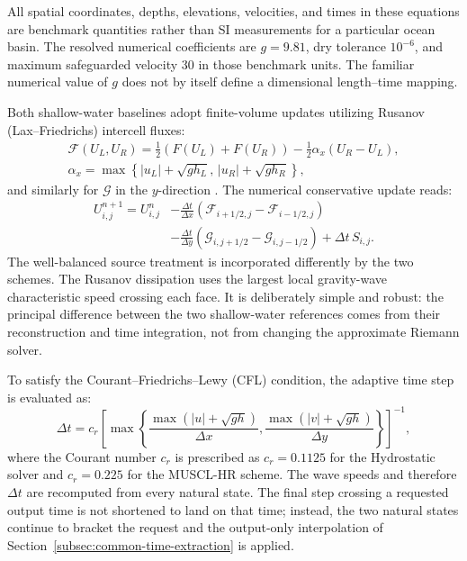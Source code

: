 All spatial coordinates, depths, elevations, velocities, and times in these equations are benchmark quantities rather than SI measurements for a particular ocean basin. The resolved numerical coefficients are $g = 9.81$, dry tolerance $10^{-6}$, and maximum safeguarded velocity $30$ in those benchmark units. The familiar numerical value of $g$ does not by itself define a dimensional length--time mapping.

Both shallow-water baselines adopt finite-volume updates utilizing Rusanov (Lax–Friedrichs) intercell fluxes:
\begin{equation}
\begin{split}
\mathcal{F}(U_L, U_R) = \frac{1}{2}\left(F(U_L) + F(U_R)\right) - \frac{1}{2} \alpha_x(U_R - U_L),
\\
\alpha_x = \max\!\left\{|u_L| + \sqrt{gh_L},\, |u_R| + \sqrt{gh_R}\right\},
\end{split}
\end{equation}
and similarly for $\mathcal{G}$ in the $y$-direction \citep{toro2009riemann,toro2026rusanov}. The numerical conservative update reads:
\begin{equation}
\begin{split}
U_{i,j}^{n + 1} = U_{i, j}^{n}
&- \frac{\Delta t}{\Delta x}
\left(\mathcal{F}_{i + 1/2, j} - \mathcal{F}_{i - 1/2, j}\right) \\
&- \frac{\Delta t}{\Delta y}
\left(\mathcal{G}_{i, j + 1/2} - \mathcal{G}_{i, j - 1/2}\right)
+ \Delta t\,S_{i, j}.
\end{split}
\end{equation}
The well-balanced source treatment is incorporated differently by the two schemes. The Rusanov dissipation uses the largest local gravity-wave characteristic speed crossing each face. It is deliberately simple and robust: the principal difference between the two shallow-water references comes from their reconstruction and time integration, not from changing the approximate Riemann solver.

To satisfy the Courant–Friedrichs–Lewy (CFL) condition, the adaptive time step is evaluated as:
\begin{equation}
\Delta t = c_r\left[\max\!\left\{\frac{\max(|u| + \sqrt{gh})}{\Delta x}, \frac{\max(|v| + \sqrt{gh})}{\Delta y} \right\} \right] ^ {-1},
\end{equation}
where the Courant number $c_r$ is prescribed as $c_r = 0.1125$ for the Hydrostatic solver and $c_r = 0.225$ for the MUSCL-HR scheme. The wave speeds and therefore $\Delta t$ are recomputed from every natural state. The final step crossing a requested output time is not shortened to land on that time; instead, the two natural states continue to bracket the request and the output-only interpolation of Section~\ref{subsec:common-time-extraction} is applied.

